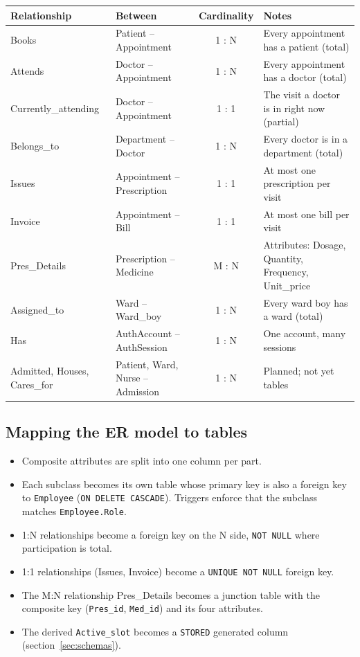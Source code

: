 \documentclass[11pt,a4paper]{article}
\newcommand{\code}[1]{\texttt{#1}}
\begin{document}
\begin{center}
\small
\begin{tabularx}{\textwidth}{l l c L}
\toprule
\textbf{Relationship} & \textbf{Between} & \textbf{Cardinality} & \textbf{Notes} \\
\midrule
Books               & Patient -- Appointment      & 1 : N & Every appointment has a patient (total) \\
Attends             & Doctor -- Appointment       & 1 : N & Every appointment has a doctor (total) \\
Currently\_attending & Doctor -- Appointment      & 1 : 1 & The visit a doctor is in right now (partial) \\
Belongs\_to         & Department -- Doctor        & 1 : N & Every doctor is in a department (total) \\
Issues              & Appointment -- Prescription & 1 : 1 & At most one prescription per visit \\
Invoice             & Appointment -- Bill         & 1 : 1 & At most one bill per visit \\
Pres\_Details       & Prescription -- Medicine    & M : N & Attributes: Dosage, Quantity, Frequency, Unit\_price \\
Assigned\_to        & Ward -- Ward\_boy           & 1 : N & Every ward boy has a ward (total) \\
Has                 & AuthAccount -- AuthSession  & 1 : N & One account, many sessions \\
Admitted, Houses, Cares\_for & Patient, Ward, Nurse -- Admission & 1 : N & Planned; not yet tables \\
\bottomrule
\end{tabularx}
\end{center}

\subsection{Mapping the ER model to tables}

\begin{itemize}
  \item Composite attributes are split into one column per part.
  \item Each subclass becomes its own table whose primary key is also a foreign key to \code{Employee} (\code{ON DELETE CASCADE}). Triggers enforce that the subclass matches \code{Employee.Role}.
  \item 1:N relationships become a foreign key on the N side, \code{NOT NULL} where participation is total.
  \item 1:1 relationships (Issues, Invoice) become a \code{UNIQUE NOT NULL} foreign key.
  \item The M:N relationship Pres\_Details becomes a junction table with the composite key (\code{Pres\_id}, \code{Med\_id}) and its four attributes.
  \item The derived \code{Active\_slot} becomes a \code{STORED} generated column (section~\ref{sec:schemas}).
\end{itemize}
\end{document}
